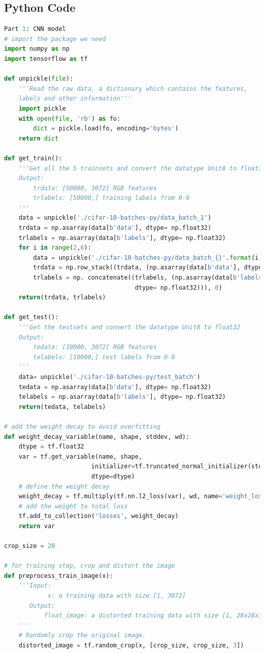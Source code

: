 \documentclass[hyperref]{article}
\theoremstyle{nonumberplain}
\begin{document}
\begin{appendices}

\section{Python Code}
\begin{lstlisting}[language=Python]
Part 1: CNN model
# import the package we need
import numpy as np
import tensorflow as tf

def unpickle(file):
    '''Read the raw data, a dictionary which contains the features,
    labels and other information'''
    import pickle
    with open(file, 'rb') as fo:
        dict = pickle.load(fo, encoding='bytes')
    return dict

def get_train():
    '''Get all the 5 trainsets and convert the datatype Unit8 to float32
    Output:
        trdata: [50000, 3072] RGB features
        trlabels: [50000,] training labels from 0-9
    '''
    data = unpickle('./cifar-10-batches-py/data_batch_1')
    trdata = np.asarray(data[b'data'], dtype= np.float32)
    trlabels = np.asarray(data[b'labels'], dtype= np.float32)
    for i in range(2,6):
        data = unpickle('./cifar-10-batches-py/data_batch_{}'.format(i))
        trdata = np.row_stack((trdata, (np.asarray(data[b'data'], dtype= np.float32))))
        trlabels = np. concatenate((trlabels, (np.asarray(data[b'labels'],
                                    dtype= np.float32))), 0)
    return(trdata, trlabels)

def get_test():
    '''Get the testsets and convert the datatype Unit8 to float32
    Output:
        tedata: [10000, 3072] RGB features
        telabels: [10000,] test labels from 0-9
    '''
    data= unpickle('./cifar-10-batches-py/test_batch')
    tedata = np.asarray(data[b'data'], dtype= np.float32)
    telabels = np.asarray(data[b'labels'], dtype= np.float32)
    return(tedata, telabels)

# add the weight decay to avoid overfitting
def weight_decay_variable(name, shape, stddev, wd):
    dtype = tf.float32
    var = tf.get_variable(name, shape,
                        initializer=tf.truncated_normal_initializer(stddev=stddev),
                        dtype=dtype)
    # define the weight decay
    weight_decay = tf.multiply(tf.nn.l2_loss(var), wd, name='weight_loss')
    # add the weight to total loss
    tf.add_to_collection('losses', weight_decay)
    return var

crop_size = 28

# for training step, crop and distort the image
def preprocess_train_image(x):
    '''Input:
            x: a training data with size [1, 3072]
       Output:
           float_image: a distorted training data with size [1, 28x28x3]
    '''
    # Randomly crop the original image.
    distorted_image = tf.random_crop(x, [crop_size, crop_size, 3])


\end{lstlisting}
\end{appendices}
\end{document}
